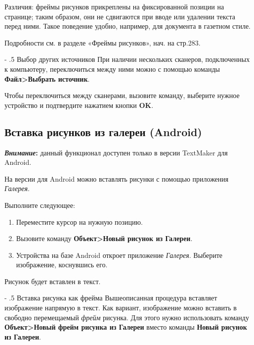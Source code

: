 \documentclass[a4paper,10pt]{article}
\makeatletter
\renewcommand\paragraph{%
   \@startsection{paragraph}{4}{0mm}%
      {-\baselineskip}%
      {.5\baselineskip}%
      {\normalfont\normalsize\bfseries}}
\makeatother
\begin{document}
Различия: фреймы рисунков прикреплены на фиксированной позиции на странице; таким образом, они не сдвигаются при вводе или удалении текста перед ними. Такое поведение удобно, например, для документа в газетном стиле.

Подробности см. в разделе «Фреймы рисунков», нач. на стр.283.

\paragraph{Выбор других источников}
При наличии нескольких сканеров, подключенных к компьютеру, переключиться между ними можно с помощью команды \textbf{Файл>Выбрать источник}.

Чтобы переключиться между сканерами, вызовите команду, выберите нужное устройство и подтвердите нажатием кнопки \textbf{OK}.

\subsection{Вставка рисунков из галереи (Android)}
\begin{mdframed}[backgroundcolor=blue!10]
\textbf{\textit{Внимание}:} данный функционал доступен только в версии TextMaker для Android.
\end{mdframed}

На версии для Android можно вставлять рисунки с помощью приложения \textit{Галерея}.

Выполните следующее:
\begin{enumerate}
 \item Переместите курсор на нужную позицию.
 \item Вызовите команду \textbf{Объект>Новый рисунок из Галереи}.
 \item Устройства на базе Android откроет приложение \textit{Галерея}. Выберите изображение, коснувшись его.
\end{enumerate}

Рисунок будет вставлен в текст.

\paragraph{Вставка рисунка как фрейма}
Вышеописанная процедура вставляет изображение напрямую в текст. Как вариант, изображение можно вставить в свободно перемещаемый \textit{фрейм} рисунка. Для этого нужно использовать команду \textbf{Объект>Новый фрейм рисунка из Галереи} вместо команды \textbf{Новый рисунок из Галереи}.
\end{document}
